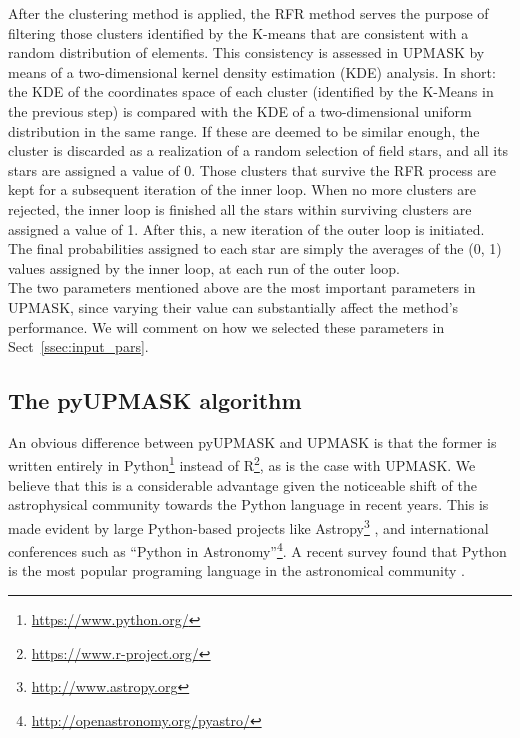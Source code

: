 \documentclass{aa}
\begin{document}
 After the clustering method is applied, the RFR method serves the purpose of
 filtering those clusters identified by the K-means that are consistent
 with a random distribution of elements. This consistency is assessed in UPMASK
 by means of a two-dimensional kernel density estimation (KDE) analysis. In
 short: the KDE of the coordinates space of each cluster (identified by the
 K-Means in the previous step) is compared with the KDE of a two-dimensional
 uniform distribution in the same range. If these are deemed to be similar
 enough, the cluster is discarded as a realization of a random selection of
 field stars, and all its stars are assigned a value of 0. Those
 clusters that survive the RFR process are kept for a subsequent iteration of
 the inner loop. When no more clusters are rejected, the inner loop is finished
 all the stars within surviving clusters are assigned a value of 1. After this,
 a new iteration of the outer loop is initiated.
 The final probabilities assigned to each star are simply the averages of the
 (0, 1) values assigned by the inner loop, at each run of the outer loop.\\

 The two parameters mentioned above are the most important parameters in
 UPMASK, since varying their value can substantially affect the
 method's performance. We will comment on how we selected these
 parameters in Sect~\ref{ssec:input_pars}.



\subsection{The pyUPMASK algorithm}
 \label{ssec:pyupmask}

  An obvious difference between pyUPMASK and UPMASK is that the former is
  written entirely in Python\footnote{\url{https://www.python.org/}} instead
  of R\footnote{\url{https://www.r-project.org/}}, as is the case with UPMASK.
  We believe that this is a considerable advantage given the noticeable shift
  of the astrophysical community towards the Python language in recent years.
  This is made evident by large Python-based projects like
  Astropy\footnote{\url{http://www.astropy.org}} \citep{astropy:2013,
  astropy:2018},
  and international conferences such as ``Python in
  Astronomy''\footnote{\url{http://openastronomy.org/pyastro/}}. A recent
  survey found that Python is the most popular programing language in the
  astronomical community \citep{Momcheva2015,Tollerud2019SustainingCS}.
\end{document}
